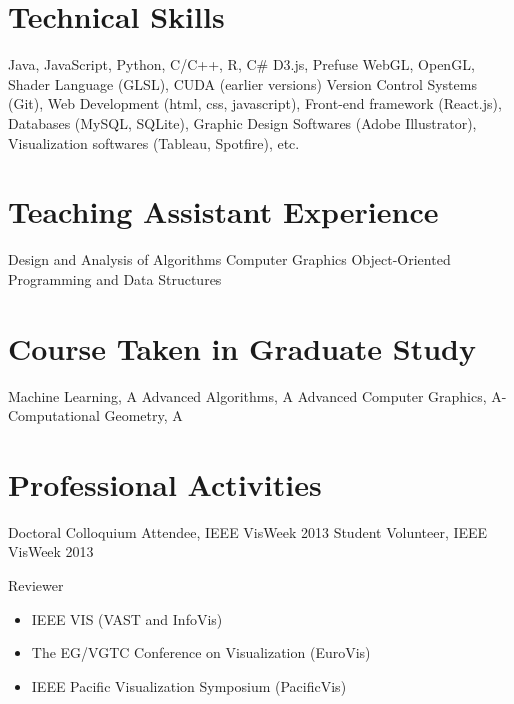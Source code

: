 \documentclass[10pt,a4paper,roman]{moderncv} %
\begin{document}
\section{Technical Skills}

 {Java, JavaScript, Python, C/C++, R, C\#}
 {D3.js, Prefuse}
 {WebGL, OpenGL, Shader Language (GLSL), CUDA (earlier versions)}
 {Version Control Systems (Git), Web Development (html, css, javascript), Front-end framework (React.js), Databases (MySQL, SQLite), Graphic Design Softwares (Adobe Illustrator), Visualization softwares (Tableau, Spotfire), etc.}



\section{Teaching Assistant Experience}

 {Design and Analysis of Algorithms}
 {Computer Graphics}
 {Object-Oriented Programming and Data Structures}


\section{Course Taken in Graduate Study}

\cvitem{} {Machine Learning, A}
\cvitem{} {Advanced Algorithms, A}
\cvitem{} {Advanced Computer Graphics, A-}
\cvitem{} {Computational Geometry, A}





\section{Professional Activities}

\cvitem{} {Doctoral Colloquium Attendee, IEEE VisWeek 2013}
\cvitem{} {Student Volunteer, IEEE VisWeek 2013}
\cvitem{} {Reviewer
\vspace{0.1cm}
\begin{itemize}
\item IEEE VIS (VAST and InfoVis)
\item The EG/VGTC Conference on Visualization (EuroVis)
\item IEEE Pacific Visualization Symposium (PacificVis)
\end{itemize}
}
\end{document}
